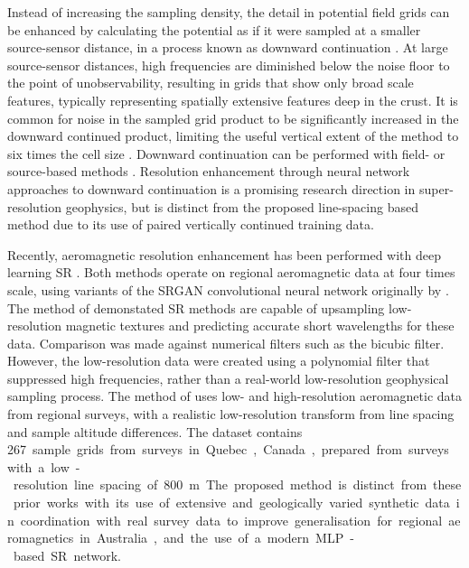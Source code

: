 Instead of increasing the sampling density, the detail in potential field grids can be enhanced by calculating the potential as if it were sampled at a smaller source-sensor distance, in a process known as downward continuation \parencite{bullardDeterminationMassesNecessary1948}.
At large source-sensor distances, high frequencies are diminished below the noise floor to the point of unobservability, resulting in grids that show only broad scale features, typically representing spatially extensive features deep in the crust.
It is common for noise in the sampled grid product to be significantly increased in the downward continued product, limiting the useful vertical extent of the method to six times the cell size \parencite{dampneyEquivalentSourceTechnique1969,zuoDownwardContinuationTransformation2020}.
Downward continuation can be performed with field- or source-based methods \parencite{pilkingtonPotentialFieldContinuation2017}.
Resolution enhancement through neural network approaches to downward continuation \parencite{liStableDownwardContinuation2023,yeHighprecisionDownwardContinuation2022} is a promising research direction in super-resolution geophysics, but is distinct from the proposed line-spacing based method due to its use of paired vertically continued training data.

Recently, aeromagnetic resolution enhancement has been performed with deep learning SR \parencite{bavandsavadkoohiHighresolutionAeromagneticMap2023,smithMagneticGridResolution2022}.
Both methods operate on regional aeromagnetic data at four times scale, using variants of the SRGAN convolutional neural network originally by \textcite{ledigPhotorealisticSingleImage2017}.
The method of \textcite{smithMagneticGridResolution2022} demonstated SR methods are capable of upsampling low-resolution magnetic textures and predicting accurate short wavelengths for these data.
Comparison was made against numerical filters such as the bicubic filter.
However, the low-resolution data were created using a polynomial filter that suppressed high frequencies, rather than a real-world low-resolution geophysical sampling process.
The method of \textcite{bavandsavadkoohiHighresolutionAeromagneticMap2023} uses low- and high-resolution aeromagnetic data from regional surveys, with a realistic low-resolution transform from line spacing and sample altitude differences.
The dataset contains \qty{267} sample grids from surveys in Quebec, Canada, prepared from surveys with a low-resolution line spacing of \qty{800}{\m}.
The proposed method is distinct from these prior works with its use of extensive and geologically varied synthetic data in coordination with real survey data to improve generalisation for regional aeromagnetics in Australia, and the use of a modern MLP-based SR network.

